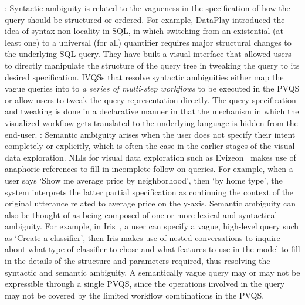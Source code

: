 : Syntactic ambiguity is related to the vagueness in the specification of how the query should be structured or ordered. For example, DataPlay introduced the idea of syntax non-locality in SQL, in which switching from an existential (at least one) to a universal (for all) quantifier requires major structural changes to the underlying SQL query. They have built a visual interface that allowed users to directly manipulate the structure of the query tree in tweaking the query to its desired specification. IVQSs that resolve syntactic ambiguities either map the vague queries into to \textit{a series of multi-step workflows} to be executed in the PVQS or allow users to tweak the query representation directly. The query specification and tweaking is done in a declarative manner in that the mechanism in which the visualized workflow gets translated to the underlying language is hidden from the end-user. 
: Semantic ambiguity arises when the user does not specify their intent completely or explicitly, which is often the case in the earlier stages of the visual data exploration. NLIs for visual data exploration such as Evizeon~\cite{Hoque2017} makes use of anaphoric references to fill in incomplete follow-on queries. For example, when a user says `Show me average price by neighborhood', then `by home type', the system interprets the latter partial specification as continuing the context of the original utterance related to average price on the y-axis. Semantic ambiguity can also be thought of as being composed of one or more lexical and syntactical ambiguity. For example, in Iris~\cite{Fast2018}, a user can specify a vague, high-level query such as `Create a classifier', then Iris makes use of nested conversations to inquire about what type of classifier to chose and what features to use in the model to fill in the details of the structure and parameters required, thus resolving the syntactic and semantic ambiguity. A semantically vague query may or may not be expressible through a single PVQS, since the operations involved in the query may not be covered by the limited workflow combinations in the PVQS. 


